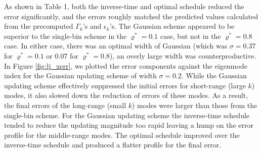 \documentclass[reprint, superscriptaddress, floatfix]{revtex4-1}
\begin{document}
As shown in Table 1,
both the inverse-time and optimal schedule reduced
the error significantly,
and the errors roughly matched the predicted values
calculated from the precomputed $\Gamma_k$'s and $\epsilon_k$'s.
%
The Gaussian scheme appeared to be superior
to the single-bin scheme in the $\varrho^* = 0.1$ case,
but not in the $\varrho^* = 0.8$ case.
%
In either case, there was an optimal width of Gaussian
(which was $\sigma = 0.37$ for $\varrho^* = 0.1$
or $0.07$ for $\varrho^* = 0.8$),
an overly large width was counterproductive.
%
In Figure \ref{fig:lj_xerr},
we plotted the error components against the eigenmode index
for the Gaussian updating scheme of width $\sigma = 0.2$.
%
While the Gaussian updating scheme effectively suppressed
the initial errors for short-range (large $k$) modes,
it also slowed down the reduction of errors of these modes.
%
As a result, the final errors of the long-range (small $k$) modes
were larger than those from the single-bin scheme.
%
For the Gaussian updating scheme
the inverse-time schedule tended to reduce the updating magnitude too rapid
leaving a hump on the error profile for the middle-range modes.
%
The optimal schedule improved over the inverse-time schedule
and produced a flatter profile for the final error.
\end{document}
